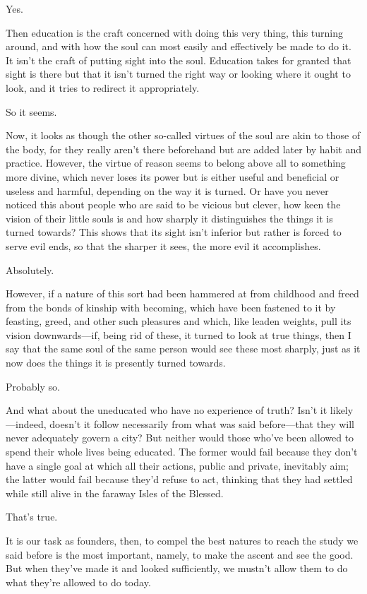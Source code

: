 			Yes. 

			Then education is the craft concerned with doing this very thing, this turning around, and with how the soul can most easily and effectively be made to do it. It isn't the craft of putting sight into the soul. Education takes for granted that sight is there but that it isn't turned the right way or looking where it ought to look, and it tries to redirect it appropriately. 

			So it seems. 

			Now, it looks as though the other so-called virtues of the soul are akin to those of the body, for they really aren't there beforehand but are added later by habit and practice. However, the virtue of reason seems to belong above all to something more divine, which never loses its power but is either useful and beneficial or useless and harmful, depending on the way it is turned. Or have you never noticed this about people who are said to be vicious but clever, how keen the vision of their little souls is and how sharply it distinguishes the things it is turned towards? This shows that its sight isn't inferior but rather is forced to serve evil ends, so that the sharper it sees, the more evil it accomplishes. 

			Absolutely. 

			However, if a nature of this sort had been hammered at from childhood and freed from the bonds of kinship with becoming, which have been fastened to it by feasting, greed, and other such pleasures and which, like leaden weights, pull its vision downwards---if, being rid of these, it turned to look at true things, then I say that the same soul of the same person would see these most sharply, just as it now does the things it is presently turned towards. 

			Probably so. 

			And what about the uneducated who have no experience of truth? Isn't it likely---indeed, doesn't it follow necessarily from what was said before---that they will never adequately govern a city? But neither would those who've been allowed to spend their whole lives being educated. The former would fail because they don't have a single goal at which all their actions, public and private, inevitably aim; the latter would fail because they'd refuse to act, thinking that they had settled while still alive in the faraway Isles of the Blessed. 

			That's true. 

			It is our task as founders, then, to compel the best natures to reach the study we said before is the most important, namely, to make the ascent and see the good. But when they've made it and looked sufficiently, we mustn't allow them to do what they're allowed to do today. 


